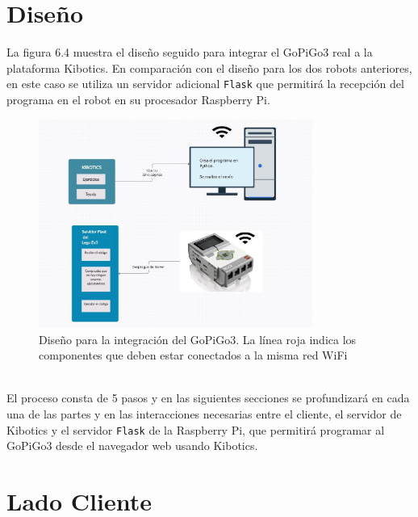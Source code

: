 \section{Diseño}

La figura 6.4 muestra el diseño seguido para integrar el GoPiGo3 real a la plataforma Kibotics. En comparación con el diseño para los dos robots anteriores, en este caso se utiliza un servidor adicional \texttt{Flask} que permitirá la recepción del programa en el robot en su procesador Raspberry Pi.
\\
\begin{figure}[h!]
  \centering
    \includegraphics[width=0.8\textwidth]{img/esquema.JPG}
  \caption{Diseño para la integración del GoPiGo3. La línea roja indica los componentes que deben estar conectados a la misma red WiFi}
  \label{Diseño para la integración del GoPiGo3}
\end{figure}
\\
El proceso consta de 5 pasos y en las siguientes secciones se profundizará en cada una de las partes y en las interacciones necesarias entre el cliente, el servidor de Kibotics y el servidor \texttt{Flask} de la Raspberry Pi, que permitirá programar al GoPiGo3 desde el navegador web usando Kibotics.

\section{Lado Cliente}

